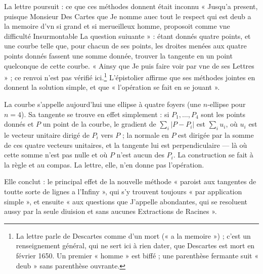 \documentclass[11pt,a4paper]{article}
\begin{document}
La lettre poursuit : ce que ces méthodes donnent était inconnu « Jusqu'a
present, puisque Monsieur Des Cartes que Je nomme auec tout le respect qui est
deub a la memoire d'vn si grand et si merueilleux homme, proposoit comme vne
difficulté Insurmontable La question suiuante » : étant donnés quatre points,
et une courbe telle que, pour chacun de ses points, les droites menées aux
quatre points donnés fassent une somme donnée, trouver la tangente en un point
quelconque de cette courbe. « Ainsy que Je puis faire voir par vne de ses
Lettres » ; ce renvoi n'est pas vérifié ici.\footnote{La lettre parle de
Descartes comme d'un mort (« a la memoire ») ; c'est un renseignement général,
qui ne sert ici à rien dater, que Descartes est mort en février 1650. Un
premier « homme » est biffé ; une parenthèse fermante suit « deub » sans
parenthèse ouvrante.} L'épistolier affirme que ses méthodes jointes en donnent
la solution simple, et que « l'opération se fait en se jouant ».

La courbe s'appelle aujourd'hui une ellipse à quatre foyers (une
$n$-ellipse pour $n = 4$). Sa tangente se trouve en effet simplement : si
$P_1,\dots,P_4$ sont les points donnés et $P$ un point de la courbe, le gradient
de $\sum_i |P - P_i|$ est $\sum_i u_i$, où $u_i$ est le vecteur unitaire dirigé
de $P_i$ vers $P$ ; la normale en $P$ est dirigée par la somme de ces quatre
vecteurs unitaires, et la tangente lui est perpendiculaire — là où cette somme
n'est pas nulle et où $P$ n'est aucun des $P_i$. La construction se fait à la
règle et au compas. La lettre, elle, n'en donne pas l'opération.

Elle conclut : le principal effet de la nouvelle méthode « paroist aux
tangentes de toutte sorte de lignes a l'Infiny », qui s'y trouvent toujours
« par application simple », et ensuite « aux questions que J'appelle
abondantes, qui se resoluent aussy par la seule diuision et sans aucunes
Extractions de Racines ».
\end{document}
